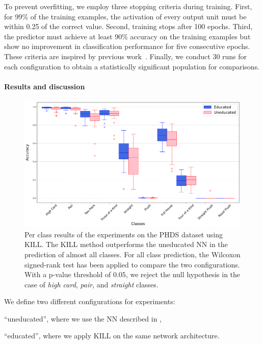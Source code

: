 To prevent overfitting, we employ three stopping criteria during training.
%
First, for 99\% of the training examples, the activation of every output unit must be within 0.25 of the correct value.
%
Second, training stops after 100 epochs.
%
Third, the predictor must achieve at least 90\% accuracy on the training examples but show no improvement in classification performance for five consecutive epochs.
%
These criteria are inspired by previous work~\cite{Towell90}.
%
Finally, we conduct 30 runs for each configuration to obtain a statistically significant population for comparisons.


\paragraph{Results and discussion}\label{par:phds-results}
%

%
\begin{figure}
    \centering
    \includegraphics[width=\linewidth]{figures/phds-kill-results}
    \caption[PHDS KILL results]{
        Per class results of the experiments on the \gls{PHDS} dataset using \gls{KILL}.
        The \gls{KILL} method outperforms the uneducated \gls{NN} in the prediction of almost all classes.
        For all class prediction, the Wilcoxon signed-rank test has been applied to compare the two configurations.
        With a p-value threshold of $0.05$, we reject the null hypothesis in the case of \emph{high card}, \emph{pair}, and \emph{straight} classes.
    }
    \label{fig:phds-kill-results}
\end{figure}
%
We define two different configurations for experiments:
%
\begin{inlinelist}
    \item ``uneducated'', where we use the \gls{NN} described in ,
    \item ``educated'', where we apply \gls{KILL} on the same network architecture.
\end{inlinelist}
